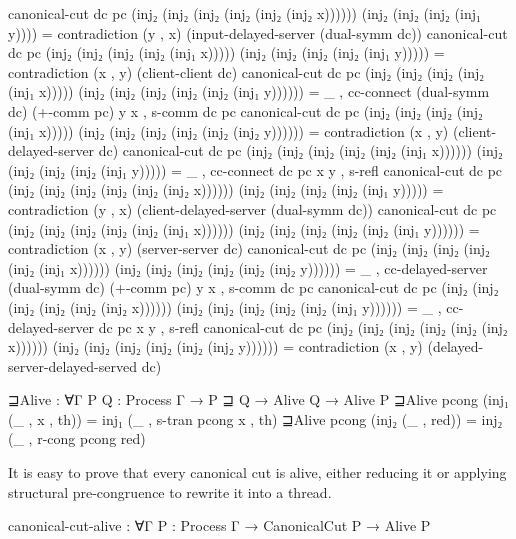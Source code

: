\begin{code}[hide]
canonical-cut dc pc (inj₂ (inj₂ (inj₂ (inj₂ (inj₂ (inj₂ x)))))) (inj₂ (inj₂ (inj₂ (inj₁ y)))) = contradiction (y , x) (input-delayed-server (dual-symm dc))
canonical-cut dc pc (inj₂ (inj₂ (inj₂ (inj₂ (inj₁ x))))) (inj₂ (inj₂ (inj₂ (inj₂ (inj₁ y))))) = contradiction (x , y) (client-client dc)
canonical-cut dc pc (inj₂ (inj₂ (inj₂ (inj₂ (inj₁ x))))) (inj₂ (inj₂ (inj₂ (inj₂ (inj₂ (inj₁ y)))))) = _ , cc-connect (dual-symm dc) (+-comm pc) y x , s-comm dc pc
canonical-cut dc pc (inj₂ (inj₂ (inj₂ (inj₂ (inj₁ x))))) (inj₂ (inj₂ (inj₂ (inj₂ (inj₂ (inj₂ y)))))) = contradiction (x , y) (client-delayed-server dc)
canonical-cut dc pc (inj₂ (inj₂ (inj₂ (inj₂ (inj₂ (inj₁ x)))))) (inj₂ (inj₂ (inj₂ (inj₂ (inj₁ y))))) = _ , cc-connect dc pc x y , s-refl
canonical-cut dc pc (inj₂ (inj₂ (inj₂ (inj₂ (inj₂ (inj₂ x)))))) (inj₂ (inj₂ (inj₂ (inj₂ (inj₁ y))))) = contradiction (y , x) (client-delayed-server (dual-symm dc))
canonical-cut dc pc (inj₂ (inj₂ (inj₂ (inj₂ (inj₂ (inj₁ x)))))) (inj₂ (inj₂ (inj₂ (inj₂ (inj₂ (inj₁ y)))))) = contradiction (x , y) (server-server dc)
canonical-cut dc pc (inj₂ (inj₂ (inj₂ (inj₂ (inj₂ (inj₁ x)))))) (inj₂ (inj₂ (inj₂ (inj₂ (inj₂ (inj₂ y)))))) = _ , cc-delayed-server (dual-symm dc) (+-comm pc) y x , s-comm dc pc
canonical-cut dc pc (inj₂ (inj₂ (inj₂ (inj₂ (inj₂ (inj₂ x)))))) (inj₂ (inj₂ (inj₂ (inj₂ (inj₂ (inj₁ y)))))) = _ , cc-delayed-server dc pc x y , s-refl
canonical-cut dc pc (inj₂ (inj₂ (inj₂ (inj₂ (inj₂ (inj₂ x)))))) (inj₂ (inj₂ (inj₂ (inj₂ (inj₂ (inj₂ y)))))) = contradiction (x , y) (delayed-server-delayed-served dc)

⊒Alive : ∀{Γ} {P Q : Process Γ} → P ⊒ Q → Alive Q → Alive P
⊒Alive pcong (inj₁ (_ , x , th)) = inj₁ (_ , s-tran pcong x , th)
⊒Alive pcong (inj₂ (_ , red)) = inj₂ (_ , r-cong pcong red)
\end{code}

It is easy to prove that every canonical cut is alive, either reducing it or
applying structural pre-congruence to rewrite it into a thread.

\begin{code}
canonical-cut-alive : ∀{Γ} {P : Process Γ} → CanonicalCut P → Alive P
\end{code}

